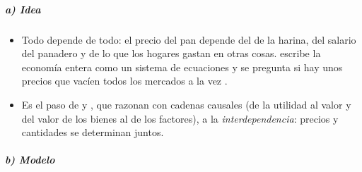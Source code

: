 \documentclass[11pt]{article}
\begin{document}
\subparagraph{a) Idea}

\begin{itemize}
\item Todo depende de todo: el precio del pan depende del de la harina, del salario del panadero y de lo que los hogares gastan en otras cosas.  escribe la economía entera como un sistema de ecuaciones y se pregunta si hay unos precios que vacíen todos los mercados a la vez .
\item Es el paso de  y , que razonan con cadenas causales (de la utilidad al valor y del valor de los bienes al de los factores), a la \emph{interdependencia}: precios y cantidades se determinan juntos.
\end{itemize}

\subparagraph{b) Modelo}
\end{document}
